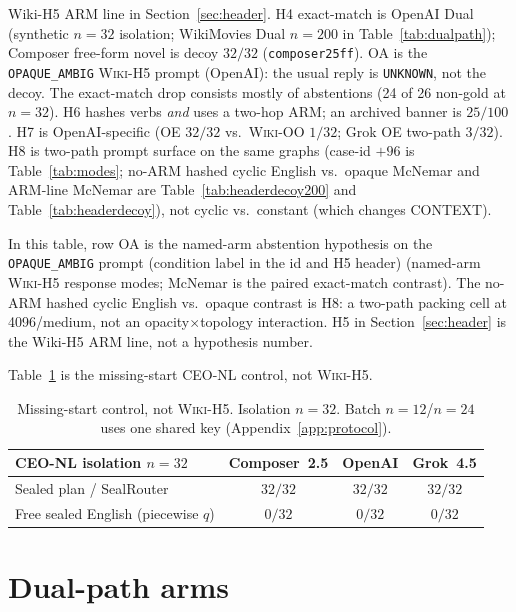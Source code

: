 \documentclass{article}
\begin{document}
\begin{table}[h]
{Wiki-H5 ARM line in Section~\ref{sec:header}.
H4 exact-match is OpenAI Dual (synthetic $n{=}32$ isolation; WikiMovies Dual
$n{=}200$ in Table~\ref{tab:dualpath}); Composer free-form
novel is decoy $32/32$ (\texttt{composer25ff}). OA is the \texttt{OPAQUE\_AMBIG}
\textsc{Wiki-H5} prompt (OpenAI): the usual reply is \texttt{UNKNOWN}, not the decoy.
The exact-match drop consists mostly of abstentions (24 of 26 non-gold at
$n{=}32$).
H6 hashes verbs \emph{and} uses a two-hop ARM; an archived banner
is $25/100$. H7 is OpenAI-specific (OE $32/32$ vs.\ \textsc{Wiki-OO} $1/32$;
Grok OE two-path $3/32$).
H8 is two-path prompt surface on the same graphs
(case-id ${+}96$ is Table~\ref{tab:modes};
no-ARM hashed cyclic English vs.\ opaque McNemar and ARM-line McNemar
are Table~\ref{tab:headerdecoy200} and Table~\ref{tab:headerdecoy}),
not cyclic vs.\ constant (which changes CONTEXT).}
\label{tab:hyp}
\end{table}

In this table, row OA is the named-arm abstention hypothesis on the
\texttt{OPAQUE\_AMBIG} prompt (condition label in the id and H5 header)
(named-arm \textsc{Wiki-H5} response modes; McNemar is the paired
exact-match contrast).
The no-ARM hashed cyclic English vs.\ opaque contrast is H8: a two-path
packing cell at 4096/medium, not an opacity$\times$topology interaction.
H5 in Section~\ref{sec:header} is the Wiki-H5 ARM line, not a hypothesis
number.

Table~\ref{tab:primary} is the missing-start CEO-NL control, not
\textsc{Wiki-H5}.

\begin{table}[h]
\centering
\small
\begin{tabular}{@{}lccc@{}}
\toprule
\textsc{CEO-NL} isolation $n{=}32$ & Composer~2.5 & OpenAI & Grok~4.5 \\
\midrule
Sealed plan / SealRouter & $32/32$ & $32/32$ & $32/32$ \\
Free sealed English (piecewise $q$) & $0/32$ & $0/32$ & $0/32$ \\
\bottomrule
\end{tabular}
\caption{Missing-start control, not \textsc{Wiki-H5}. Isolation $n{=}32$.
Batch $n{=}12$/$n{=}24$ uses one shared key (Appendix~\ref{app:protocol}).}
\label{tab:primary}
\end{table}
\FloatBarrier

\section{Dual-path arms}
\label{app:dual}
\end{document}
